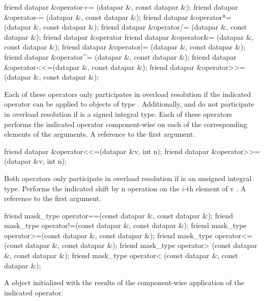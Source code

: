 \begin{itemdecl}
friend datapar &operator+= (datapar &, const datapar &);
friend datapar &operator-= (datapar &, const datapar &);
friend datapar &operator*= (datapar &, const datapar &);
friend datapar &operator/= (datapar &, const datapar &);
friend datapar &operator%
friend datapar &operator&= (datapar &, const datapar &);
friend datapar &operator|= (datapar &, const datapar &);
friend datapar &operator^= (datapar &, const datapar &);
friend datapar &operator<<=(datapar &, const datapar &);
friend datapar &operator>>=(datapar &, const datapar &);
\end{itemdecl}
\begin{itemdescr}
  \pnum\remarks Each of these operators only participates in overload resolution if the indicated operator can be applied to objects of type .
  Additionally,  and  do not participate in overload resolution if  is a signed integral type.
  \pnum\effects Each of these operators performs the indicated operator component-wise on each of the corresponding elements of the arguments.
  \pnum\returns A reference to the first argument.
\end{itemdescr}

\begin{itemdecl}
friend datapar &operator<<=(datapar &v, int n);
friend datapar &operator>>=(datapar &v, int n);
\end{itemdecl}
\begin{itemdescr}
  \pnum\remarks Both operators only participate in overload resolution if  is an unsigned integral type.
  \pnum\effects Performs the indicated shift by \code n operation on the $i$-th element of \code v \foralli.
  \pnum\returns A reference to the first argument.
\end{itemdescr}

\begin{itemdecl}
friend mask_type operator==(const datapar &, const datapar &);
friend mask_type operator!=(const datapar &, const datapar &);
friend mask_type operator>=(const datapar &, const datapar &);
friend mask_type operator<=(const datapar &, const datapar &);
friend mask_type operator> (const datapar &, const datapar &);
friend mask_type operator< (const datapar &, const datapar &);
\end{itemdecl}
\begin{itemdescr}
  \pnum\returns A \mask object initialized with the results of the component-wise application of the indicated operator.
\end{itemdescr}

